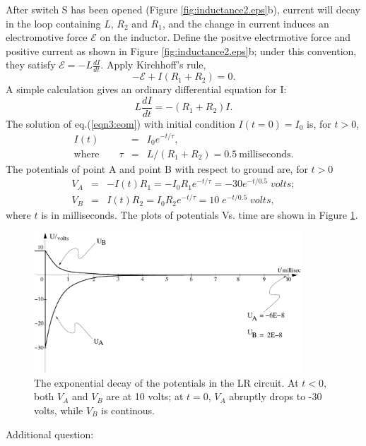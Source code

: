 \documentclass[makesolutionspdf]{esg8022pset}
\begin{document}
\begin{solution}
After switch S has been opened (Figure \ref{fig:inductance2.eps}b),
current will decay in the loop containing $L$, $R_2$ and $R_1$, and
the change in current induces an electromotive force $\mathcal{E}$ on
the inductor.  Define the positve electrmotive force and positive
current as shown in Figure \ref{fig:inductance2.eps}b; under this
convention, they satisfy ${\mathcal{E}}=-L\frac{dI}{dt}$.  Apply
Kirchhoff's rule,
\begin{equation}
-{\mathcal{E}}+I(R_1+R_2)=0.
\end{equation}
A simple calculation gives an ordinary differential equation for I:
\begin{equation}\label{eqn3:eom}
L\frac{dI}{dt}=-(R_1+R_2)I.
\end{equation}
The solution of eq.(\ref{eqn3:eom}) with initial condition
$I(t=0)=I_0$ is, for $t>0$,
\begin{eqnarray}
I(t) &=& I_0 e^{-t/\tau},\\
\textrm{where}\qquad \tau &=& L/(R_1+R_2)=0.5\: \textrm{milliseconds}.
\end{eqnarray}
The potentials of point A and point B with respect to ground are, for $t>0$
\begin{eqnarray}
V_A &=& -I(t)R_1=-I_0 R_1 e^{-t/\tau}= -30e^{-t/0.5}\;volts;\\
V_B &=& I(t)R_2=I_0 R_2 e^{-t/\tau}= 10\;e^{-t/0.5}\;volts,
\end{eqnarray}
where $t$ is in milliseconds.  The plots of potentials Vs. time are
shown in Figure \ref{fig:graph22.eps}.


\begin{figure}[H]
    \centering
    \includegraphics[width = 10cm]{graph22}
    \caption{The exponential decay of the potentials in the LR circuit.
At $t<0$, both $V_A$ and $V_B$ are at 10 volts; at $t=0$, $V_A$
abruptly drops to -30 volts, while $V_B$ is continous.}
    \label{fig:graph22.eps}
  \end{figure}


Additional question: 


\end{solution}
\end{document}
